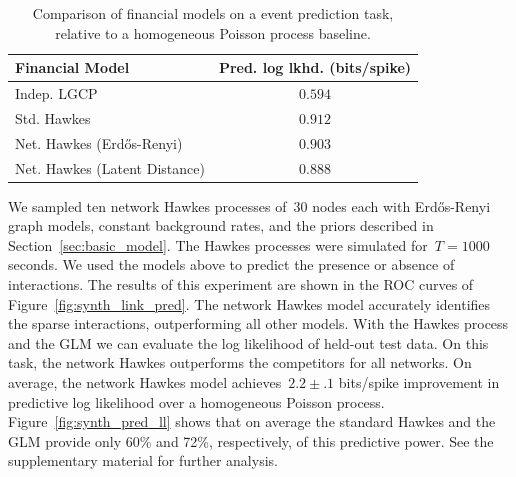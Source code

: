 \begin{table}
  \begin{center}
    \begin{tabular}{|l|c|}
      \hline
      \textbf{Financial Model} & \textbf{Pred. log lkhd. (bits/spike)} \\
      \hline
      Indep. LGCP & $0.594$ \\
      Std. Hawkes & $0.912$ \\
      Net. Hawkes (Erd\H{o}s-Renyi) & $0.903$ \\
      Net. Hawkes (Latent Distance) & $0.888$ \\
      \hline
    \end{tabular}
  \end{center}
    \caption{Comparison of financial models on a event prediction task, relative to a homogeneous Poisson process baseline.}
    \label{tab:financial_pred_ll}
\end{table}

We sampled ten network Hawkes processes of~$30$ nodes each with Erd\H{o}s-Renyi graph models, constant background rates, and the priors described in Section~\ref{sec:basic_model}. The Hawkes processes were simulated for~${T=1000}$ seconds. We used the models above to predict the presence or absence of interactions. The results of this experiment are shown in the ROC curves of Figure~\ref{fig:synth_link_pred}. The network Hawkes model accurately identifies the sparse interactions, outperforming all other models.
With the Hawkes process and the GLM we can evaluate the log likelihood of held-out test data. On this task, the network Hawkes outperforms the competitors for all networks. On average, the network Hawkes model achieves~$2.2\pm.1$ bits/spike improvement in predictive log likelihood over a homogeneous Poisson process. Figure~\ref{fig:synth_pred_ll} shows that on average the standard Hawkes and the GLM provide only 60\% and 72\%, respectively, of this predictive power. See the supplementary material for further analysis.

